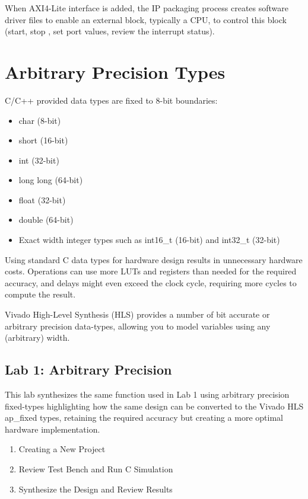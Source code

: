 \begin{highlight}
    When AXI4-Lite interface is added, the IP packaging process creates software driver files to enable an external block, typically a CPU, to control this block (start, stop , set port values, review the interrupt status).
\end{highlight}


\section{Arbitrary Precision Types}
C/C++ provided data types are fixed to 8-bit boundaries:
\begin{itemize}
    \item char (8-bit)
    \item short (16-bit)
    \item int (32-bit)
    \item long long (64-bit)
    \item float (32-bit)
    \item double (64-bit)
    \item Exact width integer types such as int16\_t (16-bit) and int32\_t (32-bit)
\end{itemize}
Using standard C data types for
hardware design results in unnecessary hardware costs. Operations can use more LUTs and
registers than needed for the required accuracy, and delays might even exceed the clock
cycle, requiring more cycles to compute the result.

\begin{highlight}
    Vivado High-Level Synthesis (HLS) provides a number of bit accurate or arbitrary precision data-types, allowing you to model variables using any (arbitrary) width.
\end{highlight}

\subsection{Lab 1: Arbitrary Precision}
This lab synthesizes the same function used in Lab 1 using arbitrary precision fixed-types highlighting how the same design can be converted to the Vivado HLS ap\_fixed types, retaining the required accuracy but
creating a more optimal hardware implementation.

\begin{enumerate}[label=Step \arabic*:]
    \item Creating a New Project 
    \item Review Test Bench and Run C Simulation
    \item Synthesize the Design and Review Results
\end{enumerate}

